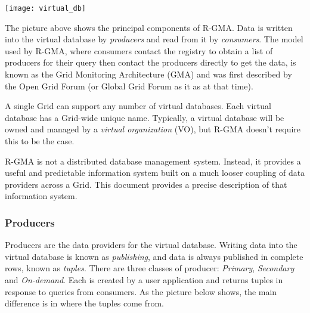 \begin{center}
\texttt{[image: virtual\_db]}
\end{center}

The picture above shows the principal components of R-GMA. Data is written into 
the virtual database by \textit{producers} and read from it by 
\textit{consumers}. The model used by R-GMA, where consumers contact the 
registry to obtain a list of producers for their query then contact the 
producers directly to get the data, is known as the Grid Monitoring 
Architecture (GMA) and was first described by the Open Grid Forum (or Global
Grid Forum as it as at that time).

A single Grid can support any number of virtual databases. Each
virtual database has a Grid-wide unique name. Typically, a virtual
database will be owned and managed by a \textit{virtual
organization} (VO), but R-GMA doesn't require this to be the case.

R-GMA is not a distributed database management system. Instead, it
provides a useful and predictable information system built on a much
looser coupling of data providers across a Grid. This document
provides a precise description of that information system.

\subsubsection{Producers}

Producers are the data providers for the virtual
database. Writing data into the virtual database is known as
\textit{publishing}, and data is always published in complete rows,
known as \textit{tuples}.  There are three classes of
producer: \textit{Primary},
\textit{Secondary} and
\textit{On-demand}. Each is created by a user application
and returns tuples in response to queries from consumers. As the
picture below shows, the main difference is in where the tuples come
from.

